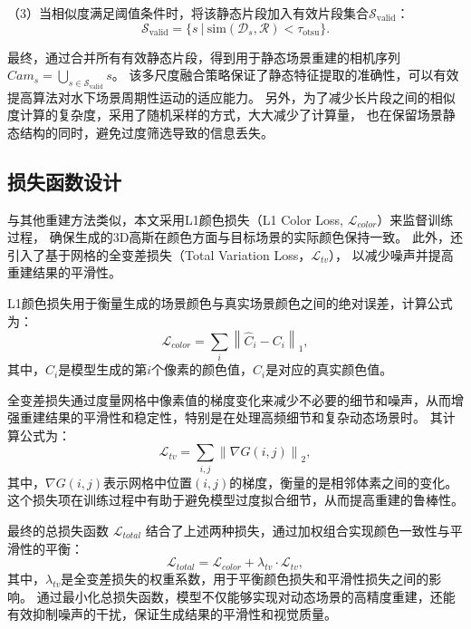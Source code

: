 （3）当相似度满足阈值条件时，将该静态片段加入有效片段集合$\mathcal{S}_{\text{valid}}$：
\begin{equation}
\mathcal{S}_{\text{valid}} = \{s \ | \ \text{sim}(\mathcal{D}_s, \mathcal{R}) < \tau_{\text{otsu}}\}.
\end{equation}

最终，通过合并所有有效静态片段，得到用于静态场景重建的相机序列$Cam_s=\bigcup_{s\in\mathcal{S}_{\text{valid}}}s$。
该多尺度融合策略保证了静态特征提取的准确性，可以有效提高算法对水下场景周期性运动的适应能力。
另外，为了减少长片段之间的相似度计算的复杂度，采用了随机采样的方式，大大减少了计算量，
也在保留场景静态结构的同时，避免过度筛选导致的信息丢失。

\subsection{损失函数设计}
与其他重建方法类似\cite{3DGS}\cite{tineuvox}\cite{dnerf}，本文采用L1颜色损失（L1 Color Loss, $\mathcal{L}_{color}$）来监督训练过程，
确保生成的3D高斯在颜色方面与目标场景的实际颜色保持一致。
此外，还引入了基于网格的全变差损失（Total Variation Loss，$\mathcal{L}_{tv}$），
以减少噪声并提高重建结果的平滑性。

L1颜色损失用于衡量生成的场景颜色与真实场景颜色之间的绝对误差，计算公式为：
\begin{equation}
    \mathcal{L}_{color} = \sum_{i} \left\| \hat{C}_i - C_i \right\|_1,
\end{equation}
其中，$\hat{C}_i$是模型生成的第$i$个像素的颜色值，$C_i$是对应的真实颜色值。

全变差损失通过度量网格中像素值的梯度变化来减少不必要的细节和噪声，从而增强重建结果的平滑性和稳定性，特别是在处理高频细节和复杂动态场景时。
其计算公式为：
\begin{equation}
    \mathcal{L}_{tv} = \sum_{i,j} \left\| \nabla G(i,j) \right\|_2,
\end{equation}
其中，$\nabla G(i,j)$表示网格中位置$(i,j)$的梯度，衡量的是相邻体素之间的变化。这个损失项在训练过程中有助于避免模型过度拟合细节，从而提高重建的鲁棒性。

最终的总损失函数 $\mathcal{L}_{total}$ 结合了上述两种损失，通过加权组合实现颜色一致性与平滑性的平衡：
\begin{equation}
\mathcal{L}_{total} = \mathcal{L}_{color} + \lambda_{tv} \cdot \mathcal{L}_{tv},
\end{equation}
其中，$\lambda_{tv}$是全变差损失的权重系数，用于平衡颜色损失和平滑性损失之间的影响。
通过最小化总损失函数，模型不仅能够实现对动态场景的高精度重建，还能有效抑制噪声的干扰，保证生成结果的平滑性和视觉质量。

